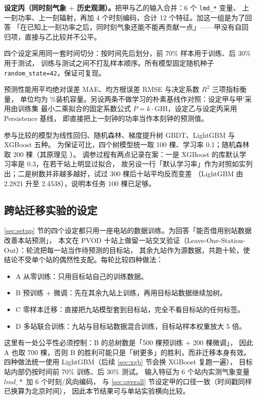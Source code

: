 \documentclass[11pt,a4paper]{ctexart}
\begin{document}
\textbf{设定丙（同时刻气象 $+$ 历史观测）。}把甲与乙的输入合并：6 个 \texttt{lmd\_*} 变量、
上一刻功率、上一刻辐射，再加 4 个时刻编码，合计 12 个特征。加这一组是为了回答
「在已知上一刻功率之后，同时刻气象还能不能再贡献一点」——甲没有自回归项，直接与乙比较并不公平。

四个设定采用同一套时间切分：按时间先后划分，前 70\% 样本用于训练、后 30\% 用于测试，
训练与测试之间不打乱样本顺序。所有模型固定随机种子 \texttt{random\_state=42}，保证可复现。

预测性能用平均绝对误差 MAE、均方根误差 RMSE 与决定系数 $R^2$ 三项指标衡量，
单位均为 \%装机容量。另设两条不做学习的朴素基线作对照：设定甲与甲$'$采用由训练集
最小二乘拟合的固定系数公式 $P=k\cdot \mathrm{GHI}$，设定乙与设定丙采用 Persistence 基线，
即直接把上一刻钟的功率当作本刻钟的预测值。

参与比较的模型为线性回归、随机森林、梯度提升树 GBDT、LightGBM 与 XGBoost 五种。
为保证可比，四个树模型统一取 100 棵、学习率 0.1；随机森林取 200 棵（其原理见 \cite{breiman2001random}）。
调参过程有两点记录在案：一是 XGBoost 的库默认学习率是 0.3，在若干站上明显过拟合，
故另设一行「默认学习率」作为对照如实列出；二是树数并非越多越好，试过 300 棵后十站平均反而变差
（LightGBM 由 2.2821 升至 2.4538），说明本任务 100 棵已足够。

\subsection{跨站迁移实验的设定}
\label{sec:transfersetup}

\ref{sec:setup} 节的四个设定都只用一座电站的数据训练。为回答「能否借用别站数据改善本站预测」，
本文在 PVOD 十站上做留一站交叉验证（Leave-One-Station-Out）：轮流把每一站当作待预测的目标站，
其余九站作为源数据，共跑十轮，使结论不受单个站的偶然性支配。每轮比较四种做法：

\begin{itemize}
  \item A 从零训练：只用目标站自己的训练数据。
  \item B 预训练 + 微调：先在其余九站上训练，再用目标站数据继续加树。
  \item C 零样本迁移：直接把九站模型套到目标站，完全不看目标站的任何标签。
  \item D 多站联合训练：九站与目标站数据混合训练，目标站样本权重放大 5 倍。
\end{itemize}

这里有一处公平性必须控制：B 的总树数是「500 棵预训练 $+$ 200 棵微调」，
因此 A 也取 700 棵，否则 B 的胜利可能只是「树更多」的胜利，而非迁移本身有效。
四种做法统一使用 LightGBM（后续 \ref{sec:xgb} 节会换 XGBoost 复跑一遍），
目标站内部仍按时间前 70\% 训练、后 30\% 测试。
输入特征为 6 个站内实测气象变量 $lmd\_*$ 加 6 个时刻/风向编码，
与 \ref{sec:overall} 节设定甲的口径一致（时间戳同样已换算为北京时间），
因此本节结果可与单站实验横向比较。
\end{document}
